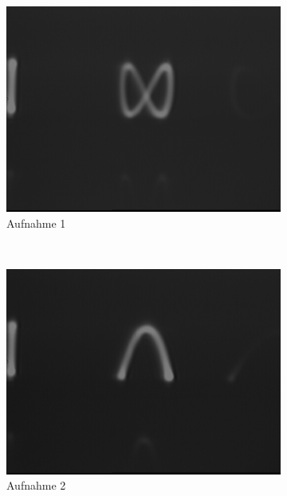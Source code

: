 \documentclass[bigchapter,colorback,accentcolor=tud4b,linedtoc,11pt]{tudreport}
\begin{document}
\begin{figure}[H]
  \centering
  \begin{subfigure}[h]{0.32\textwidth}
    \includegraphics[width=\textwidth]{data/Aufgabe7/2-1-(x-y)halbe.png}
    \caption[Cap for listoffigures]{Aufnahme 1}
  \end{subfigure}~%
  \begin{subfigure}[h]{0.32\textwidth}
    \includegraphics[width=\textwidth]{data/Aufgabe7/2-1-x.png}
    \caption[Cap for listoffigures]{Aufnahme 2}
  \end{subfigure}~%
  \begin{subfigure}[h]{0.32\textwidth}

\end{subfigure}
\end{figure}
\end{document}
